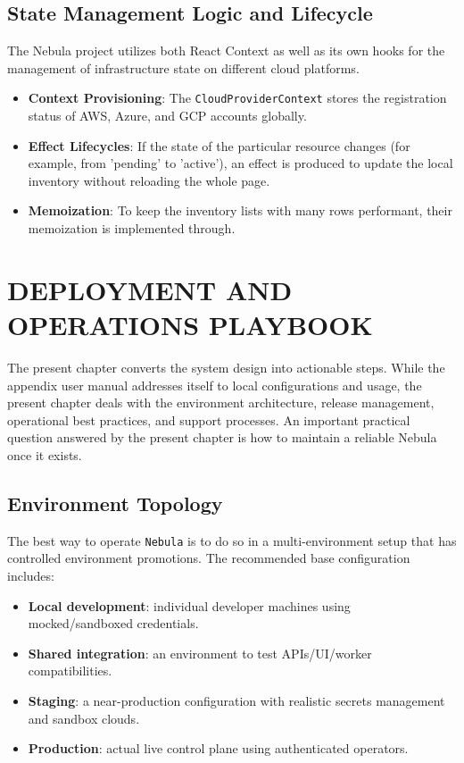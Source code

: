 \section{State Management Logic and Lifecycle}
The Nebula project utilizes both React Context as well as its own hooks for the management of infrastructure state on different cloud platforms.

\begin{itemize}
    \item \textbf{Context Provisioning}: The \texttt{CloudProviderContext} stores the registration status of AWS, Azure, and GCP accounts globally.
    \item \textbf{Effect Lifecycles}: If the state of the particular resource changes (for example, from 'pending' to 'active'), an effect is produced to update the local inventory without reloading the whole page.
    \item \textbf{Memoization}: To keep the inventory lists with many rows performant, their memoization is implemented through.

\end{itemize}

\newpage
\chapter{DEPLOYMENT AND OPERATIONS PLAYBOOK}

The present chapter converts the system design into actionable steps. While the appendix user manual addresses itself to local configurations and usage, the present chapter deals with the environment architecture, release management, operational best practices, and support processes. An important practical question answered by the present chapter is how to maintain a reliable Nebula once it exists.

\section{Environment Topology}
The best way to operate \texttt{Nebula} is to do so in a multi-environment setup that has controlled environment promotions. The recommended base configuration includes:
\begin{itemize}
    \item \textbf{Local development}: individual developer machines using mocked/sandboxed credentials.
    \item \textbf{Shared integration}: an environment to test APIs/UI/worker compatibilities.
    \item \textbf{Staging}: a near-production configuration with realistic secrets management and sandbox clouds.
    \item \textbf{Production}: actual live control plane using authenticated operators.
\end{itemize}

